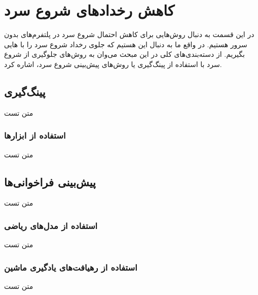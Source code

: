\section{کاهش رخداد‌های شروع سرد}

در این قسمت به دنبال روش‌هایی برای کاهش احتمال شروع سرد در پلتفرم‌های بدون سرور هستیم. در واقع ما به دنبال این هستیم که جلوی رخداد شروع سرد را با هایی بگیریم. از دسته‌بندی‌های کلی در این مبحث می‌وان به روش‌های جلوگیری از شروع سرد با استفاده از پینگ‌گیری یا روش‌های پیش‌بینی شروع سرد، اشاره کرد. 

\subsection{پینگ‌گیری}
متن تست
\subsubsection{استفاده از ابزار‌ها}
متن تست
\subsection{پیش‌بینی فراخوانی‌ها}
متن تست
\subsubsection{استفاده از مدل‌های ریاضی }
متن تست
\subsubsection{استفاده از رهیافت‌های یادگیری ماشین}
متن تست